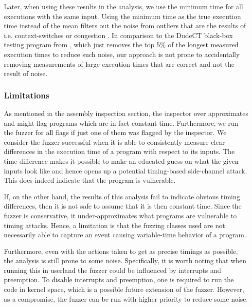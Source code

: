 Later, when using these results in the analysis, we use the minimum time for all executions with the same input.
Using the minimum time as the true execution time instead of the mean filters out the noise from outliers that are the results of i.e. context-switches or congestion \citep{robust-benchmarking}. 
In comparison to the DudeCT black-box testing program from \citep{dudect}, which just removes the top 5\% of the longest measured execution times to reduce such noise, our approach is not prone to accidentally removing measurements of large execution times that are correct and not the result of noise.

\subsubsection{Limitations}
As mentioned in the assembly inspection section, the inspector over approximates and might flag programs which are in fact constant time. Furthermore, we run the fuzzer for all flags if just one of them was flagged by the inspector.
We consider the fuzzer successful when it is able to consistently measure clear differences in the execution time of a program with respect to its inputs. 
The time difference makes it possible to make an educated guess on what the given inputs look like and hence opens up a potential timing-based side-channel attack. 
This does indeed indicate that the program is vulnerable.

If, on the other hand, the results of this analysis fail to indicate obvious timing differences, then it is not safe to assume that it is then constant time. 
Since the fuzzer is conservative, it under-approximates what programs are vulnerable to timing attacks.
Hence, a limitation is that the fuzzing classes used are not necessarily able to capture an event causing variable-time behavior of a program. 

Furthermore, even with the actions taken to get as precise timings as possible, the analysis is still prone to some noise. 
Specifically, it is worth noting that when running this in userland the fuzzer could be influenced by interrupts and preemption. 
To disable interrupts and preemption, one is required to run the code in kernel space, which is a possible future extension of the fuzzer. 
However, as a compromise, the fuzzer can be run with higher priority to reduce some noise. 
